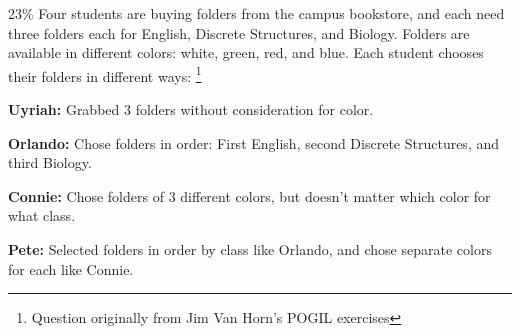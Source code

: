 \documentclass[a4paper,12pt]{book}
\begin{document}
        \newpage
        \begin{question}{3}{23\%}
            Four students are buying folders from the campus bookstore,
            and each need three folders each for English, Discrete Structures,
            and Biology. Folders are available in different colors: white, green, red, and blue.
            Each student chooses their folders in different ways:
            \footnote{Question originally from Jim Van Horn's POGIL exercises}

            \begin{framed}
                \textbf{Uyriah:} Grabbed 3 folders without consideration for color.

                \hrulefill
                
                \textbf{Orlando:} Chose folders in order: First English, second Discrete Structures,
                and third Biology.

                \hrulefill

                \textbf{Connie:} Chose folders of 3 different colors, but doesn't matter which color
                for what class.

                \hrulefill

                \textbf{Pete:} Selected folders in order by class like Orlando, and chose separate
                colors for each like Connie.
            \end{framed}
        \end{question}
\end{document}
